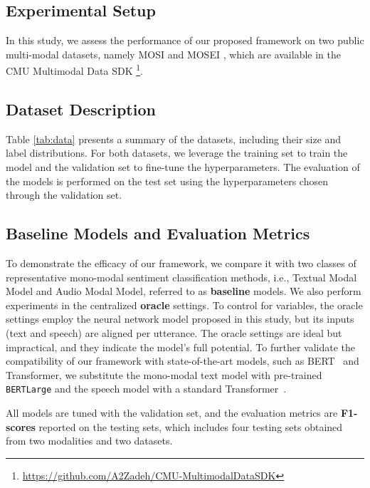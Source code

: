 \documentclass[11pt]{article}
\begin{document}
\subsection{Experimental Setup}
In this study, we assess the performance of our proposed framework on two public multi-modal datasets, namely MOSI \cite{Xueyang-zadeh2016mosi} and MOSEI \cite{Xueyang-zadeh2018multimodal}, which are available in the CMU Multimodal Data SDK \footnote{\url{https://github.com/A2Zadeh/CMU-MultimodalDataSDK}}.

\subsection{Dataset Description}
\label{sec:data}
Table \ref{tab:data} presents a summary of the datasets, including their size and label distributions. For both datasets, we leverage the training set to train the model and the validation set to fine-tune the hyperparameters. The evaluation of the models is performed on the test set using the hyperparameters chosen through the validation set.


\subsection{Baseline Models and Evaluation Metrics}
\label{sec:monomodal}
To demonstrate the efficacy of our framework, we compare it with two classes of representative mono-modal sentiment classification methods, i.e., {Textual Modal Model} and {Audio Modal Model}, referred to as \textbf{baseline} models. We also perform experiments in the centralized \textbf{oracle} settings. To control for variables, the oracle settings employ the neural network model proposed in this study, but its inputs (text and speech) are aligned per utterance. The oracle settings are ideal but impractical, and they indicate the model's full potential. To further validate the compatibility of our framework with state-of-the-art models, such as BERT~\cite{Xueyang-devlin2018bert} and Transformer, we substitute the mono-modal text model with pre-trained \texttt{BERTLarge} and the speech model with a standard Transformer~\cite{Xueyang-vaswani2017attention}.

All models are tuned with the validation set, and the evaluation metrics are \textbf{F1-scores} reported on the testing sets, which includes four testing sets obtained from two modalities and two datasets.
\end{document}
